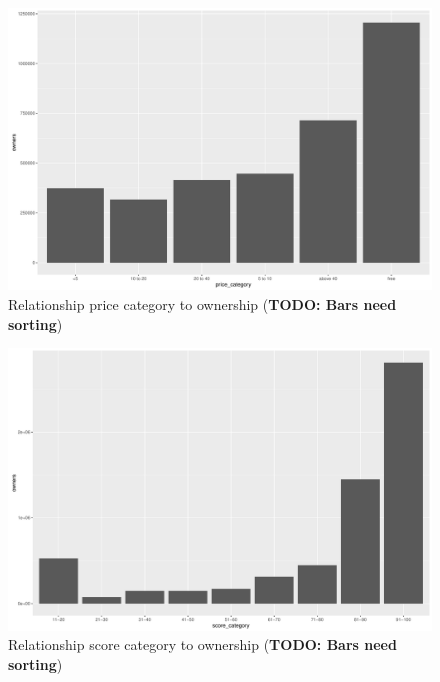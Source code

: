 \begin{figure}[!t]
	\centering
	\includegraphics[width=1.0\columnwidth]{images/rel-price-category-owners.pdf}
	\caption{Relationship price category to ownership (\textbf{TODO: Bars need sorting})}
\label{fig:rel-price-category-owners}
\end{figure}

\begin{figure}[!t]
	\centering
	\includegraphics[width=1.0\columnwidth]{images/rel-score-category-owners.pdf}
	\caption{Relationship score category to ownership (\textbf{TODO: Bars need sorting})}
\label{fig:rel-score-category-owners}
\end{figure}

